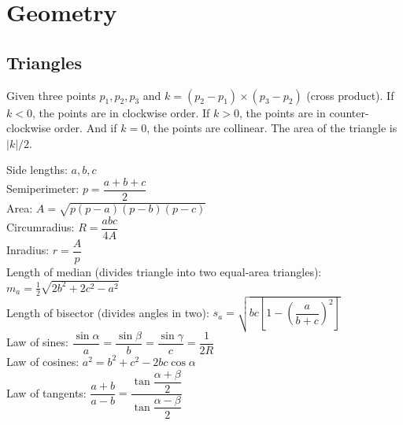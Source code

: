 \section{Geometry}

\subsection{Triangles}

Given three points $p_1, p_2, p_3$ and $k = (p_2 - p_1) \times (p_3 - p_2)$ (cross product).
If $k<0$, the points are in clockwise order. If $k>0$, the points are in counter-clockwise order. And if $k=0$, the points are collinear.
The area of the triangle is $|k|/2$.

Side lengths: $a,b,c$\\
Semiperimeter: $p=\dfrac{a+b+c}{2}$\\
Area: $A=\sqrt{p(p-a)(p-b)(p-c)}$\\
Circumradius: $R=\dfrac{abc}{4A}$\\
Inradius: $r=\dfrac{A}{p}$\\
Length of median (divides triangle into two equal-area triangles): $m_a=\tfrac{1}{2}\sqrt{2b^2+2c^2-a^2}$\\
Length of bisector (divides angles in two): $s_a=\sqrt{bc\left[1-\left(\dfrac{a}{b+c}\right)^2\right]}$\\
Law of sines: $\dfrac{\sin\alpha}{a}=\dfrac{\sin\beta}{b}=\dfrac{\sin\gamma}{c}=\dfrac{1}{2R}$\\
Law of cosines: $a^2=b^2+c^2-2bc\cos\alpha$\\
Law of tangents: $\dfrac{a+b}{a-b}=\dfrac{\tan\dfrac{\alpha+\beta}{2}}{\tan\dfrac{\alpha-\beta}{2}}$\\





